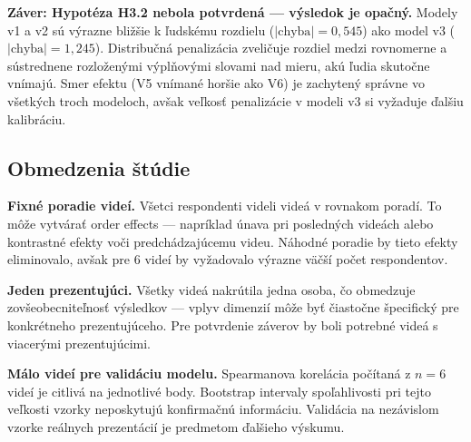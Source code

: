 \textbf{Záver: Hypotéza H3.2 nebola potvrdená --- výsledok je opačný.} Modely v1 a v2 sú výrazne bližšie k ľudskému rozdielu ($|\text{chyba}| = 0{,}545$) ako model v3 ($|\text{chyba}| = 1{,}245$). Distribučná penalizácia zveličuje rozdiel medzi rovnomerne a sústrednene rozloženými výplňovými slovami nad mieru, akú ľudia skutočne vnímajú. Smer efektu (V5 vnímané horšie ako V6) je zachytený správne vo všetkých troch modeloch, avšak veľkosť penalizácie v modeli v3 si vyžaduje ďalšiu kalibráciu.

\subsection{Obmedzenia štúdie}

\textbf{Fixné poradie videí.} Všetci respondenti videli videá v rovnakom poradí. To môže vytvárať order effects --- napríklad únava pri posledných videách alebo kontrastné efekty voči predchádzajúcemu videu. Náhodné poradie by tieto efekty eliminovalo, avšak pre 6 videí by vyžadovalo výrazne väčší počet respondentov.

\textbf{Jeden prezentujúci.} Všetky videá nakrútila jedna osoba, čo obmedzuje zovšeobecniteľnosť výsledkov --- vplyv dimenzií môže byť čiastočne špecifický pre konkrétneho prezentujúceho. Pre potvrdenie záverov by boli potrebné videá s viacerými prezentujúcimi.

\textbf{Málo videí pre validáciu modelu.} Spearmanova korelácia počítaná z $n = 6$ videí je citlivá na jednotlivé body. Bootstrap intervaly spoľahlivosti pri tejto veľkosti vzorky neposkytujú konfirmačnú informáciu. Validácia na nezávislom vzorke reálnych prezentácií je predmetom ďalšieho výskumu.
